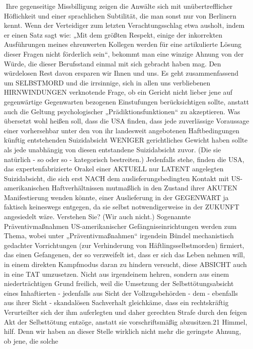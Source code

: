 \begin{multicols}{2}
Ihre gegenseitige Missbilligung zeigen die Anwälte sich
mit unübertrefflicher Höflichkeit und einer sprachlichen
Subtilität, die man sonst nur von Berlinern kennt. Wenn
der Verteidiger zum letzten Verachtungsschlag etwa ausholt, indem er einen Satz sagt wie: „Mit dem größten Respekt, einige der inkorrekten Ausführungen meines ehrenwerten Kollegen werden für eine artikulierte Lösung
dieser Fragen nicht förderlich sein“, bekommt man eine
winzige Ahnung von der Würde, die dieser Berufsstand
einmal mit sich gebracht haben mag.
Den würdelosen Rest davon ersparen wir Ihnen und
uns. Es geht zusammenfassend um SELBSTMORD und
die irrsinnige, sich in allen uns verbliebenen HIRNWINDUNGEN verknotende Frage, ob ein Gericht nicht lieber
jene auf gegenwärtige Gegenwarten bezogenen Einstufungen berücksichtigen sollte, anstatt auch die Geltung
psychologischer „Prädiktionsfunktionen“ zu akzeptieren. Was übersetzt wohl heißen soll, dass die USA finden,
dass jede zuverlässige Voraussage einer vorhersehbar
unter den von ihr landesweit angebotenen Haftbedingungen künftig entstehenden Suizidabsicht WENIGER
gerichtliches Gewicht haben sollte als jede unabhängig
von diesen entstandene Suizidabsicht zuvor. (Die sie natürlich - so oder so - kategorisch bestreiten.) Jedenfalls
stehe, finden die USA, das expertenfabrizierte Orakel
einer AKTUELL nur LATENT angelegten Suizidabsicht,
die sich erst NACH dem auslieferungsbedingten Kontakt
mit US-amerikanischen Haftverhältnissen mutmaßlich
in den Zustand ihrer AKUTEN Manifestierung wenden
könnte, einer Auslieferung in der GEGENWART ja faktisch keineswegs entgegen, da sie selbst notwendigerweise in der ZUKUNFT angesiedelt wäre. Verstehen Sie?
(Wir auch nicht.)
Sogenannte Präventivmaßnahmen US-amerikanischer
Gefängniseinrichtungen werden zum Thema, wobei unter „Präventivmaßnahmen“ irgendein Bündel mechanistisch gedachter Vorrichtungen (zur Verhinderung von
Häftlingsselbstmorden) firmiert, das einen Gefangenen,
der so verzweifelt ist, dass er sich das Leben nehmen
will, in einem direkten Kampfmodus daran zu hindern
versucht, diese ABSICHT auch in eine TAT umzusetzen.
Nicht aus irgendeinem hehren, sondern aus einem niederträchtigen Grund freilich, weil die Umsetzung der
Selbsttötungsabsicht eines Inhaftierten - jedenfalls aus
Sicht der Vollzugsbehörden - dem - ebenfalls aus ihrer
Sicht - skandalösen Sachverhalt gleichkäme, dass ein
rechtskräftig Verurteilter sich der ihm auferlegten und
daher gerechten Strafe durch den feigen Akt der Selbsttötung entzöge, anstatt sie vorschriftsmäßig abzusitzen.21
Himmel, hilf. Denn wir haben an dieser Stelle wirklich
nicht mehr die geringste Ahnung, ob jene, die solche


\end{multicols}
